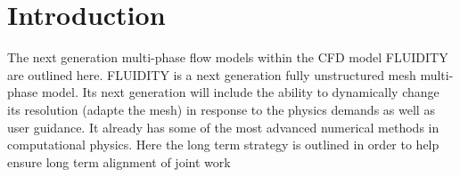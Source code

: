 
\section{Introduction}
The next generation multi-phase flow models within the 
CFD model FLUIDITY are outlined here. 
FLUIDITY is a next generation fully unstructured mesh multi-phase model. Its next generation will include the ability to dynamically change its resolution (adapte the mesh) in response to the physics demands as well as user guidance. It already has some of the most advanced numerical methods in computational physics. Here the long term strategy is outlined in order to help ensure long term alignment of joint work
